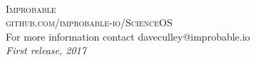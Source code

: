 \documentclass[11pt,fleqn]{book} %
\begin{document}

\newpage
~\vfill
\thispagestyle{empty}


\noindent \textsc{Improbable}\\

\noindent \textsc{github.com/improbable-io/ScienceOS}\\ %

\noindent 
For more information contact daveculley@improbable.io\\ %

\noindent \textit{First release, 2017} %



\pagestyle{empty} %

\tableofcontents %


\pagestyle{fancy} %









\end{document}
